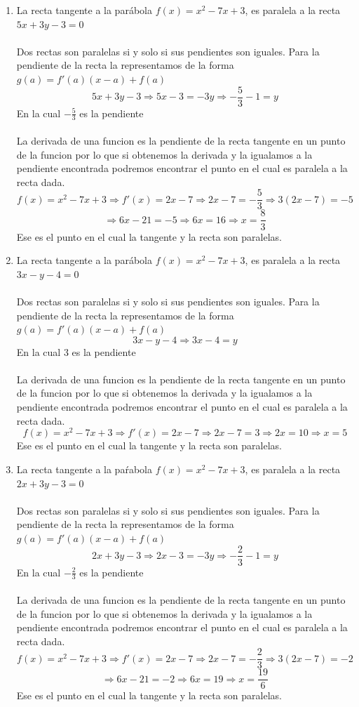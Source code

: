 \documentclass[12pt]{article}
\begin{document}
\begin{enumerate}[\hspace{9px} a)]
    \item La recta tangente a la par\'abola \(f(x)=x^2-7x+3\), es paralela a la recta \(5x+3y-3=0\) \\ \\
    Dos rectas son paralelas si y solo si sus pendientes son iguales. Para la pendiente de la recta la representamos de la forma \(g(a) = f'(a)(x-a)+f(a)\)
    \[5x+3y-3\Rightarrow 5x-3=-3y\Rightarrow -\displaystyle\frac{5}{3}-1=y\]
    En la cual \(-\displaystyle\frac{5}{3}\) es la pendiente\\ \\
    La derivada de una funcion es la pendiente de la recta tangente en un punto de la funcion por lo que si obtenemos la derivada y la igualamos a la pendiente encontrada podremos encontrar el punto en el cual es paralela a la recta dada.
    \[f(x)=x^2-7x+3\Rightarrow f'(x)=2x-7\Rightarrow 2x-7=-\displaystyle\frac{5}{3}\Rightarrow 3(2x-7)=-5\]
    \[\Rightarrow 6x-21=-5\Rightarrow 6x=16\Rightarrow x=\displaystyle\frac{8}{3}\]
     Ese es el punto en el cual la tangente y la recta son paralelas.
    \item La recta tangente a la par\'abola \(f(x)=x^2-7x+3\), es paralela a la recta \(3x-y-4=0\) \\ \\
    Dos rectas son paralelas si y solo si sus pendientes son iguales. Para la pendiente de la recta la representamos de la forma \(g(a) = f'(a)(x-a)+f(a)\)
    \[3x-y-4\Rightarrow 3x-4=y\]
    En la cual \(3\) es la pendiente\\ \\
    La derivada de una funcion es la pendiente de la recta tangente en un punto de la funcion por lo que si obtenemos la derivada y la igualamos a la pendiente encontrada podremos encontrar el punto en el cual es paralela a la recta dada.
    \[f(x)=x^2-7x+3\Rightarrow f'(x)=2x-7\Rightarrow 2x-7=3\Rightarrow 2x=10\Rightarrow x=5\]
     Ese es el punto en el cual la tangente y la recta son paralelas.
    \item La recta tangente a la pa\'rabola \(f(x)=x^2-7x+3\), es paralela a la recta \(2x+3y-3=0\) \\ \\
    Dos rectas son paralelas si y solo si sus pendientes son iguales. Para la pendiente de la recta la representamos de la forma \(g(a) = f'(a)(x-a)+f(a)\)
    \[2x+3y-3\Rightarrow 2x-3=-3y\Rightarrow -\displaystyle\frac{2}{3}-1=y\]
    En la cual \(-\displaystyle\frac{2}{3}\) es la pendiente\\ \\
    La derivada de una funcion es la pendiente de la recta tangente en un punto de la funcion por lo que si obtenemos la derivada y la igualamos a la pendiente encontrada podremos encontrar el punto en el cual es paralela a la recta dada.
    \[f(x)=x^2-7x+3\Rightarrow f'(x)=2x-7\Rightarrow 2x-7=-\displaystyle\frac{2}{3}\Rightarrow 3(2x-7)=-2\]
    \[\Rightarrow 6x-21=-2\Rightarrow 6x=19\Rightarrow x=\displaystyle\frac{19}{6}\]
     Ese es el punto en el cual la tangente y la recta son paralelas.
\end{enumerate}
\end{document}
